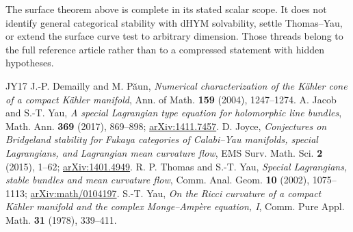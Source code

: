 \documentclass[12pt,reqno]{amsart}
\begin{document}
The surface theorem above is complete in its stated scalar scope. It does
not identify general categorical stability with dHYM solvability, settle
Thomas--Yau, or extend the surface curve test to arbitrary dimension.
Those threads belong to the full reference article rather than to a
compressed statement with hidden hypotheses.

\begin{thebibliography}{JY17}
 J.-P. Demailly and M. P\u{a}un, \emph{Numerical characterization of the K\"ahler cone of a compact K\"ahler manifold}, Ann. of Math. \textbf{159} (2004), 1247--1274.
 A. Jacob and S.-T. Yau, \emph{A special Lagrangian type equation for holomorphic line bundles}, Math. Ann. \textbf{369} (2017), 869--898; \href{https://arxiv.org/abs/1411.7457}{arXiv:1411.7457}.
 D. Joyce, \emph{Conjectures on Bridgeland stability for Fukaya categories of Calabi--Yau manifolds, special Lagrangians, and Lagrangian mean curvature flow}, EMS Surv. Math. Sci. \textbf{2} (2015), 1--62; \href{https://arxiv.org/abs/1401.4949}{arXiv:1401.4949}.
 R. P. Thomas and S.-T. Yau, \emph{Special Lagrangians, stable bundles and mean curvature flow}, Comm. Anal. Geom. \textbf{10} (2002), 1075--1113; \href{https://arxiv.org/abs/math/0104197}{arXiv:math/0104197}.
 S.-T. Yau, \emph{On the Ricci curvature of a compact K\"ahler manifold and the complex Monge--Amp\`ere equation, I}, Comm. Pure Appl. Math. \textbf{31} (1978), 339--411.
\end{thebibliography}
\end{document}
